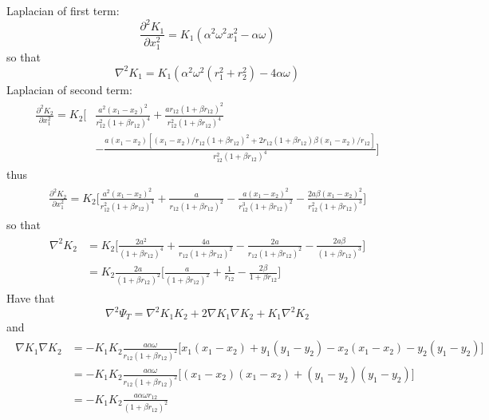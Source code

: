 \documentclass[english, a4paper]{article}
\begin{document}
Laplacian of first term:
\begin{equation}
 \frac{\partial^2 K_1}{\partial x_1^2} = K_1 (\alpha^2 \omega^2 x_1^2 -\alpha \omega )  
\end{equation}
so that
\begin{equation}
 \nabla^2 K_1 = K_1 (\alpha^2 \omega^2 (r_1^2 + r_2^2) - 4\alpha \omega)
\end{equation}
Laplacian of second term:
\begin{align}
\begin{split}
 \frac{\partial^2 K_2}{\partial x_1^2} = K_2 \Biggr[&\frac{a^2(x_1-x_2)^2}{r_{12}^2(1 + \beta r_{12})^4} +
 \frac{ar_{12}(1 + \beta r_{12})^2}{r_{12}^2(1 + \beta r_{12})^4} \\
 &-\frac{a(x_1 - x_2)[(x_1-x_2)/r_{12} (1 + \beta r_{12})^2 + 2r_{12}(1 + \beta r_{12})\beta(x_1-x_2)/r_{12}]}
 {r_{12}^2(1 + \beta r_{12})^4} \Biggr]
\end{split}
\end{align}
thus
\begin{align}
\begin{split}
 \frac{\partial^2 K_2}{\partial x_1^2} = K_2 \Biggr[\frac{a^2(x_1-x_2)^2}{r_{12}^2(1 + \beta r_{12})^4} +
 \frac{a}{r_{12}(1 + \beta r_{12})^2} 
 -\frac{a(x_1 - x_2)^2}{r_{12}^3(1 + \beta r_{12})^2}
 - \frac{2a\beta(x_1 - x_2)^2} {r_{12}^2(1 + \beta r_{12})^3} \Biggr]
\end{split}
\end{align}
so that
\begin{align}
\begin{split}
 \nabla^2 K_2 &= K_2\Biggr[\frac{2a^2}{(1 + \beta r_{12})^4} + \frac{4a}{r_{12}(1 + \beta r_{12})^2}
              - \frac{2a}{r_{12}(1 + \beta r_{12})^2} - \frac{2a\beta}{(1 + \beta r_{12})^3} \Biggr] \\
              &= K_2\frac{2a}{(1+\beta r_{12})^2}\Biggr[ \frac{a}{(1+\beta r_{12})^2} + 
              \frac{1}{r_{12}} - \frac{2\beta}{1 + \beta r_{12}} \Biggr]
\end{split}
\end{align}
Have that
\begin{equation}
 \nabla^2 \Psi_T = \nabla^2K_1K_2 + 2\nabla K_1\nabla K_2 + K_1\nabla^2K_2
\end{equation}
and
\begin{align}
\begin{split}
 \nabla K_1 \nabla K_2 &= -K_1K_2 \frac{a\alpha \omega}{r_{12}(1+\beta r_{12})^2}
 \Bigr[x_1(x_1 - x_2) + y_1(y_1 - y_2) - x_2(x_1 - x_2) - y_2(y_1 - y_2)\Bigr] \\
 &= -K_1K_2 \frac{a\alpha \omega}{r_{12}(1+\beta r_{12})^2}
 \Bigr[(x_1 - x_2)(x_1 - x_2) + (y_1 - y_2)(y_1 - y_2)\Bigr] \\
 &= -K_1K_2 \frac{a\alpha \omega r_{12}}{(1+\beta r_{12})^2}
\end{split}
\end{align}
\end{document}
